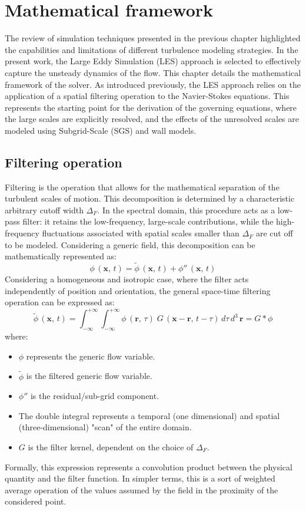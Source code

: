 \documentclass[12pt, a4paper, twoside, openright]{book}
\begin{document}
\chapter{Mathematical framework}
\label{sec:mathematical-framework}
The review of simulation techniques presented in the previous chapter highlighted the capabilities and limitations of different turbulence modeling strategies. In the present work, the Large Eddy Simulation (LES) approach is selected to effectively capture the unsteady dynamics of the flow. This chapter details the mathematical framework of the solver. As introduced previously, the LES approach relies on the application of a spatial filtering operation to the Navier-Stokes equations. This represents the starting point for the derivation of the governing equations, where the large scales are explicitly resolved, and the effects of the unresolved scales are modeled using Subgrid-Scale (SGS) and wall models.

\section{Filtering operation}
Filtering is the operation that allows for the mathematical separation of the turbulent scales of motion. This decomposition is determined by a characteristic arbitrary cutoff width $\Delta_F$. In the spectral domain, this procedure acts as a low-pass filter: it retains the low-frequency, large-scale contributions, while the high-frequency fluctuations associated with spatial scales smaller than $\Delta_F$ are cut off to be modeled. Considering a generic field, this decomposition can be mathematically represented as:
\begin{equation}
	\phi \, (\bm{x}, \, t) = \widetilde{\phi} \, (\bm{x}, \, t) + \phi'' \, (\bm{x}, \, t)
\end{equation}
Considering a homogeneous and isotropic case, where the filter acts independently of position and orientation, the general space-time filtering operation can be expressed as:
\begin{equation}
	\widetilde{\phi} \, (\bm{x}, \, t) = \int_{-\infty}^{+\infty} \! \int_{-\infty}^{+\infty} \phi \, (\bm{r}, \, \tau) \; G \, (\bm{x} - \bm{r}, \, t - \tau) \, d\tau \, d^3 \, \bm{r} = G \ast \phi
	\label{eq:les-filter-operation}
\end{equation}
where:
\begin{itemize}
	\item $\phi$ represents the generic flow variable.
	\item $\widetilde{\phi}$ is the filtered generic flow variable.
	\item $\phi''$ is the residual/sub-grid component.
	\item The double integral represents a temporal (one dimensional) and spatial (three-dimensional) "scan" of the entire domain.
	\item $G$ is the filter kernel, dependent on the choice of $\Delta_F$.
\end{itemize}
Formally, this expression represents a convolution product between the physical quantity and the filter function. In simpler terms, this is a sort of weighted average operation of the values assumed by the field in the proximity of the considered point.
\end{document}
